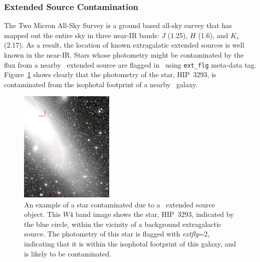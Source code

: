         \subsubsection{Extended Source Contamination}
    
    The Two Micron All-Sky Survey \citep[\mass\ ;][]{Skrutskie2006} is a ground based all-sky survey that has mapped out the entire sky in three near-IR bands: $J$ (1.25\micron), $H$ (1.6\micron), and $K_s$ (2.17\micron). As a result, the location of known extragalatic extended sources is well known in the near-IR. Stars whose photometry might be contaminated by the flux from a nearby \mass\ extended source are flagged in \WS\ using \verb|ext_flg| meta-data tag. Figure~\ref{fig:extflg_contamination} shows clearly that the photometry of the star, HIP~3293, is contaminated from the isophotal footprint of a nearby \mass\ galaxy. 
            
        \begin{figure}
        \centering
        \includegraphics[width=0.4\textwidth]{Ch2/extflg_2_HIP3293}
        \caption[Contamination From \mass\ Extended Source.]{An example of a star contaminated due to a \mass\ extended source object. This $W4$ band image shows the star, HIP~3293, indicated by the blue circle, within the vicinity of a background extragalactic source. The photometry of this star is flagged with \textit{extflg}=2, indicating that it is within the isophotal footprint of this galaxy, and is likely to be contaminated.}
        \label{fig:extflg_contamination}
        \end{figure}
        
    
        

